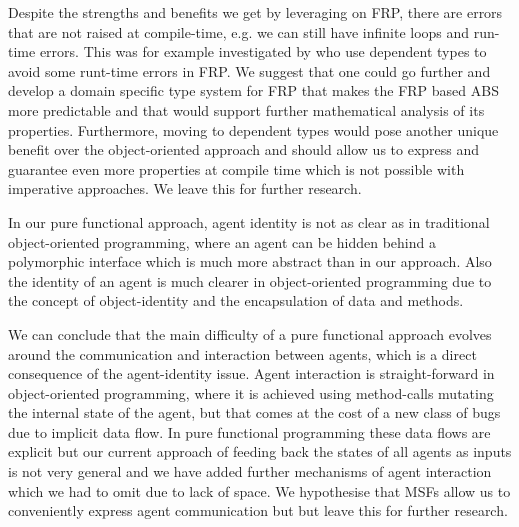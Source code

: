 Despite the strengths and benefits we get by leveraging on FRP, there are errors that are not raised at compile-time, e.g. we can still have infinite loops and run-time errors. This was for example investigated by \cite{sculthorpe_safe_2009} who use dependent types to avoid some runt-time errors in FRP. We suggest that one could go further and develop a domain specific type system for FRP that makes the FRP based ABS more predictable and that would support further mathematical analysis of its properties. Furthermore, moving to dependent types would pose another unique benefit over the object-oriented approach and should allow us to express and guarantee even more properties at compile time which is not possible with imperative approaches. We leave this for further research.

In our pure functional approach, agent identity is not as clear as in traditional object-oriented programming, where an agent can be hidden behind a polymorphic interface which is much more abstract than in our approach. Also the identity of an agent is much clearer in object-oriented programming due to the concept of object-identity and the encapsulation of data and methods.

We can conclude that the main difficulty of a pure functional approach evolves around the communication and interaction between agents, which is a direct consequence of the agent-identity issue. Agent interaction is straight-forward in object-oriented programming, where it is achieved using method-calls mutating the internal state of the agent, but that comes at the cost of a new class of bugs due to implicit data flow. In pure functional programming these data flows are explicit but our current approach of feeding back the states of all agents as inputs is not very general and we have added further mechanisms of agent interaction which we had to omit due to lack of space. We hypothesise that MSFs allow us to conveniently express agent communication but but leave this for further research.

